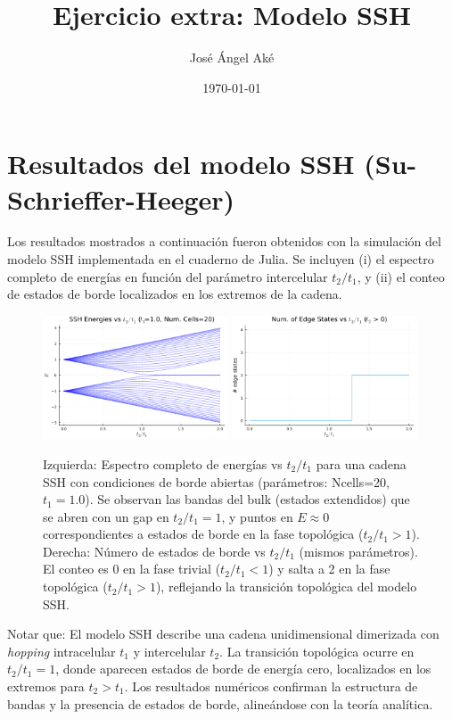 \documentclass{homework}
\author{José Ángel Aké}
\date{\today}
\title{Ejercicio extra: Modelo SSH}
\begin{document}
  
\maketitle

\section*{Resultados del modelo SSH (Su-Schrieffer-Heeger)}
Los resultados mostrados a continuación fueron obtenidos con la simulación del modelo SSH implementada en el cuaderno de Julia. Se incluyen (i) el espectro completo de energías en función del parámetro intercelular $t_2 /t_1$, y (ii) el conteo de estados de borde localizados en los extremos de la cadena.

\begin{figure}[H]
    \centering
    \includegraphics[width=0.49\textwidth]{../ssh_full_spectrum_vs_t2.png}
    \includegraphics[width=0.49\textwidth]{../ssh_edgecount_vs_t2.png}
    \caption{Izquierda: Espectro completo de energías vs $t_2/t_1$ para una cadena SSH con condiciones de borde abiertas (parámetros: Ncells=20, $t_1=1.0$). Se observan las bandas del bulk (estados extendidos) que se abren con un gap en $t_2/t_1=1$, y puntos en $E\approx0$ correspondientes a estados de borde en la fase topológica ($t_2/t_1 > 1$). 
    Derecha: Número de estados de borde vs $t_2/t_1$ (mismos parámetros). El conteo es 0 en la fase trivial ($t_2/t_1 < 1$) y salta a 2 en la fase topológica ($t_2/t_1 > 1$), reflejando la transición topológica del modelo SSH.}
    \label{fig:ssh_results}
\end{figure}

Notar que: El modelo SSH describe una cadena unidimensional dimerizada con \textit{hopping} intracelular $t_1$ y intercelular $t_2$. La transición topológica ocurre en $t_2/t_1 = 1$, donde aparecen estados de borde de energía cero, localizados en los extremos para $t_2 > t_1$. Los resultados numéricos confirman la estructura de bandas y la presencia de estados de borde, alineándose con la teoría analítica.

%
%
\end{document}
